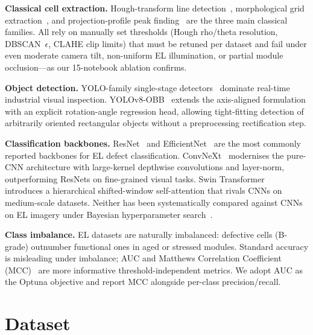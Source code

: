 \documentclass[conference]{IEEEtran}
\begin{document}
\textbf{Classical cell extraction.} Hough-transform line detection~\cite{duda1972}, morphological grid extraction~\cite{soille2003}, and projection-profile peak finding~\cite{wong1982} are the three main classical families. All rely on manually set thresholds (Hough rho/theta resolution, DBSCAN~$\epsilon$, CLAHE clip limits) that must be retuned per dataset and fail under even moderate camera tilt, non-uniform EL illumination, or partial module occlusion---as our 15-notebook ablation confirms.

\textbf{Object detection.} YOLO-family single-stage detectors~\cite{redmon2016,jocher2023} dominate real-time industrial visual inspection. YOLOv8-OBB~\cite{jocher2023} extends the axis-aligned formulation with an explicit rotation-angle regression head, allowing tight-fitting detection of arbitrarily oriented rectangular objects without a preprocessing rectification step.

\textbf{Classification backbones.} ResNet~\cite{he2016} and EfficientNet~\cite{tan2019} are the most commonly reported backbones for EL defect classification. ConvNeXt~\cite{liu2022} modernises the pure-CNN architecture with large-kernel depthwise convolutions and layer-norm, outperforming ResNets on fine-grained visual tasks. Swin Transformer~\cite{liu2021} introduces a hierarchical shifted-window self-attention that rivals CNNs on medium-scale datasets. Neither has been systematically compared against CNNs on EL imagery under Bayesian hyperparameter search~\cite{akiba2019}.

\textbf{Class imbalance.} EL datasets are naturally imbalanced: defective cells (B-grade) outnumber functional ones in aged or stressed modules. Standard accuracy is misleading under imbalance; AUC and Matthews Correlation Coefficient (MCC)~\cite{deitsch2019} are more informative threshold-independent metrics. We adopt AUC as the Optuna objective and report MCC alongside per-class precision/recall.

\section{Dataset}
\label{sec:dataset}
\end{document}
